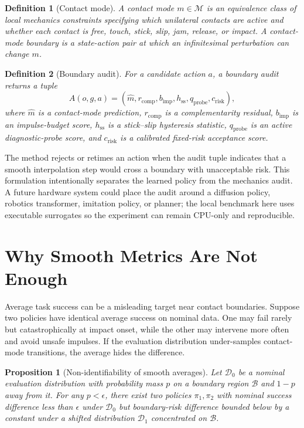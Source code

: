 \documentclass{article}
\newtheorem{definition}{Definition}
\newtheorem{proposition}{Proposition}
\begin{document}
\begin{definition}[Contact mode]
A contact mode $m\in\mathcal{M}$ is an equivalence class of local mechanics constraints specifying which unilateral contacts are active and whether each contact is free, touch, stick, slip, jam, release, or impact. A contact-mode boundary is a state-action pair at which an infinitesimal perturbation can change $m$.
\end{definition}

\begin{definition}[Boundary audit]
For a candidate action $a$, a boundary audit returns a tuple
\[
  A(o,g,a)=
  \left(\hat m, r_{\mathrm{comp}}, b_{\mathrm{imp}}, h_{\mathrm{ss}}, q_{\mathrm{probe}}, c_{\mathrm{risk}}\right),
\]
where $\hat m$ is a contact-mode prediction, $r_{\mathrm{comp}}$ is a complementarity residual, $b_{\mathrm{imp}}$ is an impulse-budget score, $h_{\mathrm{ss}}$ is a stick--slip hysteresis statistic, $q_{\mathrm{probe}}$ is an active diagnostic-probe score, and $c_{\mathrm{risk}}$ is a calibrated fixed-risk acceptance score.
\end{definition}

The method rejects or retimes an action when the audit tuple indicates that a smooth interpolation step would cross a boundary with unacceptable risk. This formulation intentionally separates the learned policy from the mechanics audit. A future hardware system could place the audit around a diffusion policy, robotics transformer, imitation policy, or planner; the local benchmark here uses executable surrogates so the experiment can remain CPU-only and reproducible.

\section{Why Smooth Metrics Are Not Enough}
Average task success can be a misleading target near contact boundaries. Suppose two policies have identical average success on nominal data. One may fail rarely but catastrophically at impact onset, while the other may intervene more often and avoid unsafe impulses. If the evaluation distribution under-samples contact-mode transitions, the average hides the difference.

\begin{proposition}[Non-identifiability of smooth averages]
Let $\mathcal{D}_{0}$ be a nominal evaluation distribution with probability mass $p$ on a boundary region $\mathcal{B}$ and $1-p$ away from it. For any $p<\epsilon$, there exist two policies $\pi_1,\pi_2$ with nominal success difference less than $\epsilon$ under $\mathcal{D}_{0}$ but boundary-risk difference bounded below by a constant under a shifted distribution $\mathcal{D}_{1}$ concentrated on $\mathcal{B}$.
\end{proposition}
\end{document}
